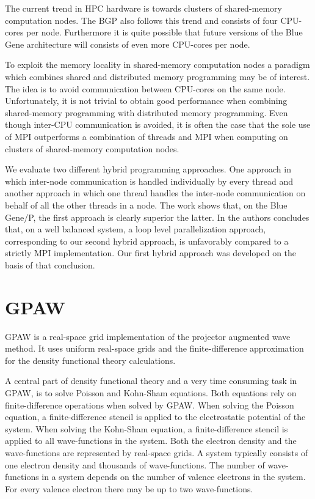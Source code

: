 \documentclass[conference]{IEEEtran}
\begin{document}
The current trend in HPC hardware is towards clusters of shared-memory computation nodes. The BGP also follows this trend and consists of four CPU-cores per node. Furthermore it is quite possible that future versions of the Blue Gene architecture will consists of even more CPU-cores per node.

To exploit the memory locality in shared-memory computation nodes a paradigm which combines shared and distributed memory programming may be of interest. The idea is to avoid communication between CPU-cores on the same node. Unfortunately, it is not trivial to obtain good performance when combining shared-memory programming with distributed memory programming. Even though inter-CPU communication is avoided, it is often the case that the sole use of MPI\cite{mpi} outperforms a combination of threads and MPI when computing on clusters of shared-memory computation nodes\cite{henty2000, hipp04Hybrid, VinterB}.

We evaluate two different hybrid programming approaches. One approach in which inter-node communication is handled individually by every thread and another approach in which one thread handles the inter-node communication on behalf of all the other threads in a node. The work shows that, on the Blue Gene/P, the first approach is clearly superior the latter. In \cite{Cappello2000} the authors concludes that, on a well balanced system, a loop level parallelization approach, corresponding to our second hybrid approach, is unfavorably compared to a strictly MPI implementation. Our first hybrid approach was developed on the basis of that conclusion.

\section{GPAW}
GPAW is a real-space grid implementation of the projector augmented wave method\cite{paw}. It uses uniform real-space grids and the finite-difference approximation for the density functional theory calculations.

A central part of density functional theory and a very time consuming task in GPAW, is to solve Poisson and Kohn-Sham equations. Both equations rely on finite-difference operations when solved by GPAW. When solving the Poisson equation, a finite-difference stencil is applied to the electrostatic potential of the system. When solving the Kohn-Sham equation, a finite-difference stencil is applied to all wave-functions in the system. Both the electron density and the wave-functions are represented by real-space grids. A system typically consists of one electron density and thousands of wave-functions. The number of wave-functions in a system depends on the number of valence electrons in the system. For every valence electron there may be up to two wave-functions.
\end{document}
